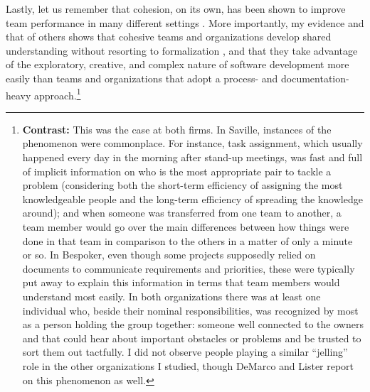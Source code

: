 Lastly, let us remember that cohesion, on its own, has been shown to improve team performance in many different settings \cite{Beal2003}. More importantly, my evidence and that of others shows that cohesive teams and organizations develop shared understanding without resorting to formalization \cite{Sharp2004,Chong2007,Teasley2002,Martin2007}, and that they take advantage of the exploratory, creative, and complex nature of software development more easily than teams and organizations that adopt a process- and documentation-heavy approach.\footnote{\textbf{Contrast:} This was the case at both firms. In Saville, instances of the phenomenon were commonplace. For instance, task assignment, which usually happened every day in the morning after stand-up meetings, was fast and full of implicit information on who is the most appropriate pair to tackle a problem (considering both the short-term efficiency of assigning the most knowledgeable people and the long-term efficiency of spreading the knowledge around); and when someone was transferred from one team to another, a team member would go over the main differences between how things were done in that team in comparison to the others in a matter of only a minute or so. In Bespoker, even though some projects supposedly relied on documents to communicate requirements and priorities, these were typically put away to explain this information in terms that team members would understand most easily. In both organizations there was at least one individual who, beside their nominal responsibilities, was recognized by most as a person holding the group together: someone well connected to the owners and that could hear about important obstacles or problems and be trusted to sort them out tactfully. I did not observe people playing a similar ``jelling'' role in the other organizations I studied, though DeMarco and Lister  report on this phenomenon as well.}

